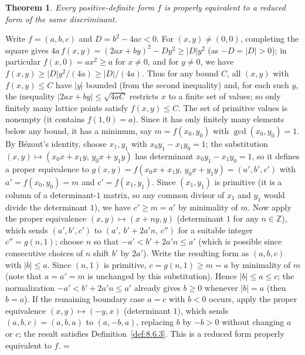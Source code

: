 \documentclass[11pt]{article}
\makeatletter
\let\nt@closedisplay\]
\def\nt@guardedclose{\@ifnextchar\par{\nt@closeafterpar}{\@ifnextchar\end{\postdisplaypenalty\@M\nt@closedisplay}{\nt@closedisplay}}}
\def\nt@closeafterpar\par{\@ifnextchar\par{\nt@closeafterpar}{\@ifnextchar\end{\postdisplaypenalty\@M\nt@closedisplay\par}{\nt@closedisplay\par}}}
\renewenvironment{proof}[1][\proofname]{\par
  \pushQED{\qed}\normalfont\topsep\medskipamount\edef\nt@afterproof{\@endparpenalty=\the\@endparpenalty\relax}\@beginparpenalty\@M\@endparpenalty\@M\let\]\nt@guardedclose\trivlist\item[]\textit{#1\@addpunct{.}} \ignorespaces}{\ifvmode\addpenalty\@M\fi\popQED\nt@afterproof\endtrivlist\@endpefalse}
\theoremstyle{ntstyle}
\newtheorem{theorem}{Theorem}[subsection]
\makeatother
\begin{document}
\begin{theorem}\label{thm:8.6.2} Every positive-definite form $f$ is properly equivalent to a
  reduced form of the same discriminant.

\end{theorem}

\begin{proof} Write $f=(a,b,c)$ and $D=b^2-4ac<0$. For
  $(x,y)\neq(0,0)$, completing the square gives
  $4a\,f(x,y)=(2ax+by)^2-Dy^2\ge|D|y^2$ (as $-D=|D|>0$); in particular
  $f(x,0)=ax^2\ge a$ for $x\neq0$, and for $y\neq0$,
  we have $f(x,y)\ge|D|y^2/(4a)\ge|D|/(4a)$. Thus for any bound $C$, all
  $(x,y)$ with $f(x,y)\le C$ have $|y|$ bounded (from the second
  inequality) and, for each such $y$, the inequality $|2ax+by|\le\sqrt{4aC}$ restricts
  $x$ to a finite set of values; so only finitely many lattice points
  satisfy $f(x,y)\le C$. The set of primitive values is nonempty (it contains $f(1,0)=a$). Since it has only
  finitely many elements below any bound, it has a minimum, say $m=f(x_0,y_0)$ with
  $\gcd(x_0, y_0)=1$. By Bézout's identity, choose $x_1,y_1$ with $x_0y_1-x_1y_0=1$;
  the substitution $(x,y)\mapsto(x_0x+x_1y,\,y_0x+y_1y)$ has
  determinant $x_0y_1-x_1y_0=1$, so it defines a proper equivalence to
  $g(x,y)=f(x_0x+x_1y,\,y_0x+y_1y)=(a',b',c')$ with $a'=f(x_0,y_0)=m$
  and $c'=f(x_1,y_1)$. Since $(x_1,y_1)$ is primitive (it is a column of a
  determinant-$1$ matrix, so any common divisor of $x_1$ and $y_1$ would
  divide the determinant $1$), we have $c'\ge m=a'$ by minimality of $m$. Now apply the
  proper equivalence $(x,y)\mapsto(x+ny,y)$ (determinant $1$ for any
  $n\in\mathbb{Z}$), which sends $(a',b',c')$ to $(a',\,b'+2a'n,\,c'')$
  for a suitable integer $c''=g(n,1)$; choose $n$ so that
  $-a'<b'+2a'n\le a'$ (which is possible since consecutive choices of $n$ shift
  $b'$ by $2a'$). Write the resulting form as $(a,b,c)$ with $|b|\le a$. Since $(n,1)$ is primitive,
  $c=g(n,1)\ge m=a$ by minimality of
  $m$ (note that $a=a'=m$ is unchanged by this substitution). Hence $|b|\le a\le c$; the normalization
  $-a'<b'+2a'n\le a'$ already gives $b\ge0$ whenever $|b|=a$ (then
  $b=a$). If the remaining boundary case $a=c$ with $b<0$ occurs, apply the proper equivalence
  $(x,y)\mapsto(-y,x)$ (determinant $1$), which sends $(a,b,c)=(a,b,a)$ to $(a,-b,a)$, replacing
  $b$ by $-b>0$ without changing $a$ or $c$; the result satisfies Definition~\ref{def:8.6.3}. This is a reduced
  form properly equivalent to $f$.
\end{proof}
\end{document}
